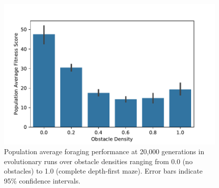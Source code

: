 \begin{figure}[!htbp]
\begin{center}
\includegraphics[width=\textwidth]{img/obstacle_density_average_fitness.pdf}
\caption{
Population average foraging performance at 20,000 generations in evolutionary runs over obstacle densities ranging from 0.0 (no obstacles) to 1.0 (complete depth-first maze).
Error bars indicate 95\% confidence intervals.
}
\label{fig:obstacle_density_average_fitness}
\end{center}
\end{figure}
